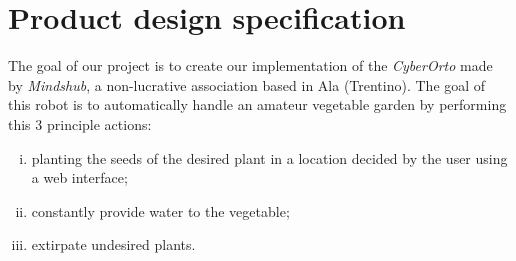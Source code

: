 \section{Product design specification}
	The goal of our project is to create our implementation of the \textit{CyberOrto} \cite{cyberorto} made by \textit{Mindshub}, a non-lucrative association based in Ala (Trentino). The goal of this robot is to automatically handle an amateur vegetable garden by performing this 3 principle actions:
	\begin{enumerate}[i)]
		\item planting the seeds  of the desired plant in a location decided by the user using a web interface;
		\item constantly provide water to the vegetable;
		\item extirpate undesired plants.
	\end{enumerate}

